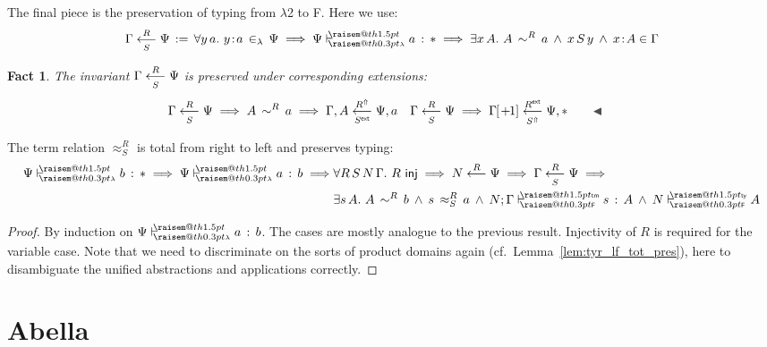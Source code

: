 \documentclass[a4paper,UKenglish]{lipics-v2016}
\makeatletter
\newcommand{\ms}{\,}
\newcommand{\mrel}[1]{\mathrel{\ms #1 \ms}}
\newcommand{\OF}{\mrel{:}}
\newcommand{\mAnd}{\mrel{\wedge}}
\newcommand{\mAll}[1]{\ensuremath{\forall} #1.\ms\ms}
\newcommand{\mEx}[1]{\ensuremath{\exists} #1.\ms\ms}
\newcommand{\eqdef}{\mrel{:=}}
\newcommand{\SysL}{$\lambda$2\xspace}
\newcommand{\ty}{\mathsf{ty}}
\newcommand{\tm}{\mathsf{tm}}
\newcommand{\of}{\ensuremath{\!:\!}}
\newcommand{\cc}[2]{#1;#2} %
\newcommand{\raisemath}[1]{\mathpalette{\raisem@th{#1}}}
\newcommand{\raisem@th}[3]{\raisebox{#1}{\ensuremath{#2#3}}}
\newcommand{\tsAnnot}[2]{\vdash\hspace{-.7em}^{\raisemath{1.5pt}{\scriptscriptstyle{#2}}}_{\raisemath{0.3pt}{\scriptscriptstyle{#1}}}} %
\newcommand{\tfF}{\tsAnnot{\mathsf{F}}{\ty}}  %
\newcommand{\tyF}{\tsAnnot{\mathsf{F}}{\tm}}  %
\newcommand{\istyF}[2]{\ensuremath{{#1} \mathrel{\tfF} #2}}
\newcommand{\typingF}[3]{\ensuremath{{#1} \mathrel{\tyF} #2 \OF #3}}
\newcommand{\tyL}{\tsAnnot{\lambda}{}} %
\newcommand{\typingL}[3]{\ensuremath{{#1} \mathrel{\tyL} #2 \OF #3}}
\newcommand{\inL}{\mrel{\in_{\lambda}}}
\newcommand{\tyr}{\mathrel{\sim}}
\newcommand{\tmr}{\mathrel{\approx}}
\newcommand{\Rext}[1]{\ensuremath{#1^{\mathsf{ext}}}}
\newcommand{\Rshift}[1]{\ensuremath{#1^{\Uparrow}}}
\newcommand{\tyctxrelLF}[3]{\ensuremath{#1\mathrel{\mathop{\longleftarrow}^{#2}\limits}#3}}
\newcommand{\tmctxrelLF}[4]{\ensuremath{#1\mathrel{\mathop{\longleftarrow}^{#2}_{#3}\limits}#4}}
\newcommand{\Prp}{\ensuremath{\textrm{\textasteriskcentered}}}
\newcommand{\subst}[1]{\hphantom{|}\!\![{#1}]}
\newcommand{\shift}{\ensuremath{\hspace{0.1em}\mathsf{+}\hspace{0.08em}\!1}}
\theoremstyle{plain}
\newtheorem{fact}[theorem]{Fact}
\makeatother
\begin{document}
The final piece is the preservation of typing from \SysL to F.
Here we use:
\begin{align*}
  \tmctxrelLF{\Gamma}{R}{S}{\Psi} \eqdef \mAll{y\,a} y \of a \inL \Psi \implies \typingL{\Psi}{a}{\Prp} \implies \mEx{x\,A} A\,\tyr^R\,a \mAnd x\,S\,y \mAnd x \of A \in \Gamma
\end{align*}
\begin{fact}
  \label{fac:inv-tmfl-ext}
  The invariant $\tmctxrelLF{\Gamma}{R}{S}{\Psi}$ is preserved under corresponding extensions:
  \begin{align*}
    &\tmctxrelLF{\Gamma}{R}{S}{\Psi} \implies A\,\tyr^R\,a \implies \tmctxrelLF{\Gamma,A}{\Rshift{R}}{\Rext{S}}{\Psi,a} & &\tmctxrelLF{\Gamma}{R}{S}{\Psi} \implies \tmctxrelLF{\Gamma\subst{\shift}}{\Rext{R}}{\Rshift{S}}{\Psi,\Prp}\tag*{\qedsymbol}
  \end{align*}
\end{fact}
\begin{lemma}
  The term relation $\tmr^R_S$ is total from right to left and preserves typing:
  \begin{align*}
    \typingL{\Psi}{b}{\Prp} \implies \typingL{\Psi}{a}{b} \implies &\mAll{R\,S\,N\,\Gamma} R\ms\ms\mathsf{inj} \implies \tyctxrelLF{N}{R}{\Psi} \implies \tmctxrelLF{\Gamma}{R}{S}{\Psi} \implies \\
                                                                &\mEx{s\,A} A\,\tyr^R\,b \mAnd s\,\tmr^R_S\,a \mAnd \typingF{\cc{N}{\Gamma}}{s}{A} \mAnd \istyF{N}{A}
  \end{align*}
\end{lemma}
\begin{proof}
  By induction on $\typingL{\Psi}{a}{b}$.
  The cases are mostly analogue to the previous result.
  Injectivity of $R$ is required for the variable case.
  Note that we need to discriminate on the sorts of product domains again (cf.\ Lemma~\ref{lem:tyr_lf_tot_pres}), here to disambiguate the unified abstractions and applications correctly.
\end{proof}

\section{Abella}
\label{sec:abella}
\end{document}
